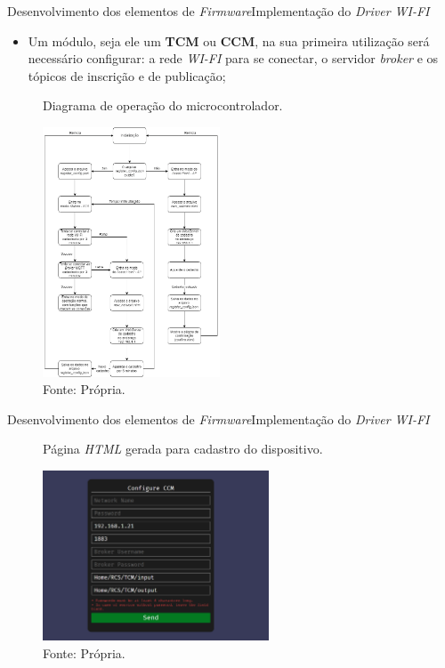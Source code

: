 \begin{frame}{Desenvolvimento dos elementos de \textit{Firmware}}{Implementação do \textit{Driver WI-FI}}
  \begin{itemize}
    \item Um módulo, seja ele um \textbf{TCM} ou \textbf{CCM}, na sua primeira utilização será necessário configurar: a rede \textit{WI-FI} para se conectar, o servidor \textit{broker} e os tópicos de inscrição e de publicação;
  \end{itemize}
  
\end{frame}

\begin{frame}{}
  \vspace*{-0.3cm}
  \begin{figure}[H]
    \centering
    \caption{Diagrama de operação do microcontrolador.}
    \includegraphics[width=0.47\textwidth]{figuras/firmware_sequence.png}
    \vspace*{-0.1cm}
    \caption*{\tiny{Fonte: Própria.}}
    \label{fig:firmware_sequence}
  \end{figure}
\end{frame}

\begin{frame}{Desenvolvimento dos elementos de \textit{Firmware}}{Implementação do \textit{Driver WI-FI}}
  \begin{figure}[H]
    \centering
    \caption{Página \textit{HTML} gerada para cadastro do dispositivo.}
    \includegraphics[width=0.6\textwidth]{figuras/cadastro_client.png}
    \caption*{\tiny{Fonte: Própria.}}
  \end{figure}
\end{frame}

